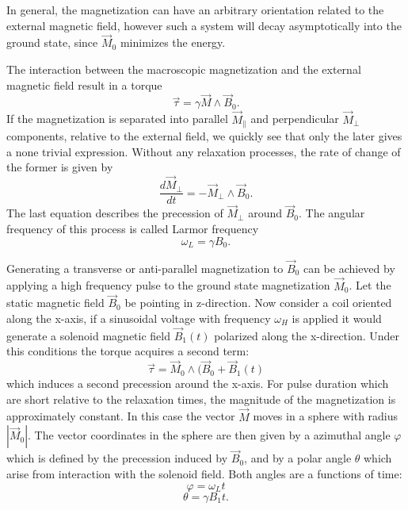In general, the magnetization can have an arbitrary orientation related to the external magnetic field, however such a system will decay asymptotically into the ground state, since $\vec{M}_0$ minimizes the energy. 

The interaction between the macroscopic magnetization and the external magnetic field result in a torque
\begin{equation}
\vec{\tau} = \gamma\vec{M} \wedge\vec{B}_0.
\end{equation}
If the magnetization is separated into parallel $\vec{M}_{\parallel}$ and perpendicular $\vec{M}_{\perp}$ components, relative to the external field, we quickly see that only the later gives a none trivial expression. Without any relaxation processes, the rate of change of the former is given by
\begin{equation}
\frac{d \vec{M}_{\perp}}{dt} = -\vec{M}_{\perp}\wedge\vec{B}_0.
\end{equation}
The last equation describes the precession of $\vec{M}_{\perp}$ around $\vec{B}_0$. The angular frequency of this process is called Larmor frequency
\begin{equation}
\omega_L = \gamma B_0.
\end{equation}

Generating a transverse or anti-parallel magnetization to $\vec{B}_0$ can be achieved by applying a high frequency pulse to the ground state magnetization $\vec{M}_0$. 
Let the static magnetic field $\vec{B}_0$ be pointing in z-direction. Now consider a coil oriented along the x-axis, if a sinusoidal voltage with frequency $\omega_H$ is applied it would generate a solenoid magnetic field $\vec{B}_1(t)$ polarized along the x-direction. Under this conditions the torque  acquires a second term:
\begin{equation}
\vec{\tau} = \vec{M}_0\wedge(\vec{B}_0 + \vec{B}_1(t)
\end{equation}
which induces a second precession around the x-axis.
For pulse duration which are short relative to the relaxation times, the magnitude of the magnetization is approximately constant. In this case the vector $\vec{M}$ moves in a sphere with radius $|\vec{M}_0|$. The vector coordinates in the sphere are then given by a azimuthal angle $\varphi$ which is defined by the precession induced by $\vec{B}_0$, and by a polar angle $\theta$ which arise from interaction with the solenoid field. Both angles are a functions of time:
\begin{equation}
\varphi = \omega_L t
\end{equation}
\begin{equation}
\theta = \gamma B_1 t.
\end{equation}

